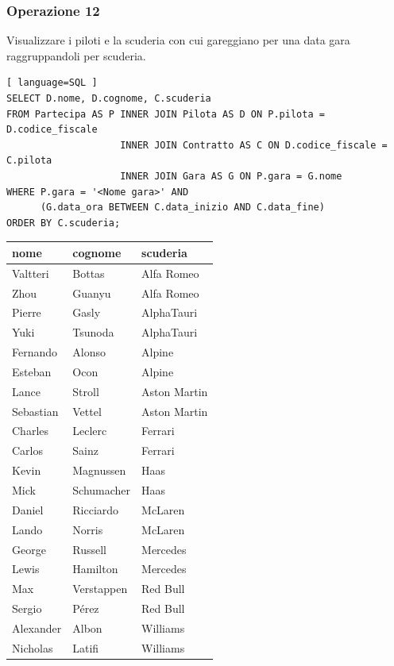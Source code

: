 \documentclass[11pt]{article}
\begin{document}
\subsubsection{Operazione 12}
Visualizzare i piloti e la scuderia con cui gareggiano per una data gara raggruppandoli per scuderia.
\begin{lstlisting}[ language=SQL ]
SELECT D.nome, D.cognome, C.scuderia
FROM Partecipa AS P INNER JOIN Pilota AS D ON P.pilota = D.codice_fiscale
                    INNER JOIN Contratto AS C ON D.codice_fiscale = C.pilota
                    INNER JOIN Gara AS G ON P.gara = G.nome
WHERE P.gara = '<Nome gara>' AND
      (G.data_ora BETWEEN C.data_inizio AND C.data_fine)
ORDER BY C.scuderia;
\end{lstlisting}

\begin{table}[H]
    \centering
    \begin{tabular}{|l|l|l|}
    \hline
        nome & cognome & scuderia \\ \hline
        Valtteri & Bottas & Alfa Romeo \\ \hline
        Zhou & Guanyu & Alfa Romeo \\ \hline
        Pierre & Gasly & AlphaTauri \\ \hline
        Yuki & Tsunoda & AlphaTauri \\ \hline
        Fernando & Alonso & Alpine \\ \hline
        Esteban & Ocon & Alpine \\ \hline
        Lance & Stroll & Aston Martin \\ \hline
        Sebastian & Vettel & Aston Martin \\ \hline
        Charles & Leclerc & Ferrari \\ \hline
        Carlos & Sainz & Ferrari \\ \hline
        Kevin & Magnussen & Haas \\ \hline
        Mick & Schumacher & Haas \\ \hline
        Daniel & Ricciardo & McLaren \\ \hline
        Lando & Norris & McLaren \\ \hline
        George & Russell & Mercedes \\ \hline
        Lewis & Hamilton & Mercedes \\ \hline
        Max & Verstappen & Red Bull \\ \hline
        Sergio & Pérez & Red Bull \\ \hline
        Alexander & Albon & Williams \\ \hline
        Nicholas & Latifi & Williams \\ \hline
    \end{tabular}
\end{table}
\end{document}
